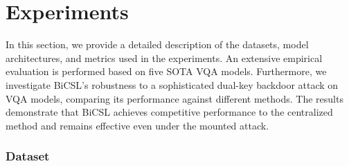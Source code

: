 \documentclass[letterpaper]{article} %
\begin{document}


\section{Experiments}

In this section, we provide a detailed description of the datasets, model architectures, and metrics used in the experiments. An extensive empirical evaluation is performed based on five SOTA VQA models. Furthermore, we investigate BiCSL's robustness to a sophisticated dual-key backdoor attack on VQA models, comparing its performance against different methods. The results demonstrate that BiCSL achieves competitive performance to the centralized method and remains effective even under the mounted attack.

\subsubsection{Dataset} 
\end{document}
